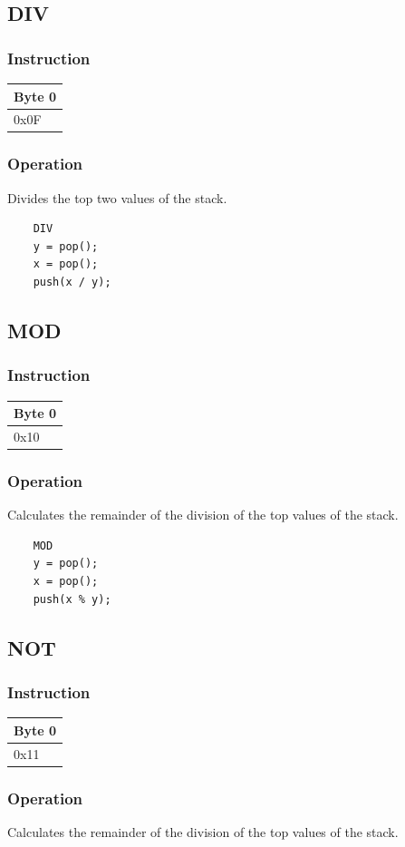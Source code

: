 \documentclass[11pt]{report}
\newcommand{\onebyteinstruction}[1]{
\begin{tabular}{|p{3.9em}|}
\hline
\tiny{Byte 0} \\ \hline
#1  \\ \hline
\end{tabular}
}
\begin{document}
\subsection{DIV}
\subsubsection{Instruction}
\onebyteinstruction{0x0F}

\subsubsection{Operation}
Divides the top two values of the stack.

	\begin{lstlisting}
	DIV
	y = pop();
	x = pop();
	push(x / y);
	\end{lstlisting}

\subsection{MOD}
\subsubsection{Instruction}
\onebyteinstruction{0x10}

\subsubsection{Operation}
Calculates the remainder of the division of the top values of the stack.

	\begin{lstlisting}
	MOD
	y = pop();
	x = pop();
	push(x % y);
	\end{lstlisting}

\subsection{NOT}
\subsubsection{Instruction}
\onebyteinstruction{0x11}

\subsubsection{Operation}
Calculates the remainder of the division of the top values of the stack.
\end{document}
